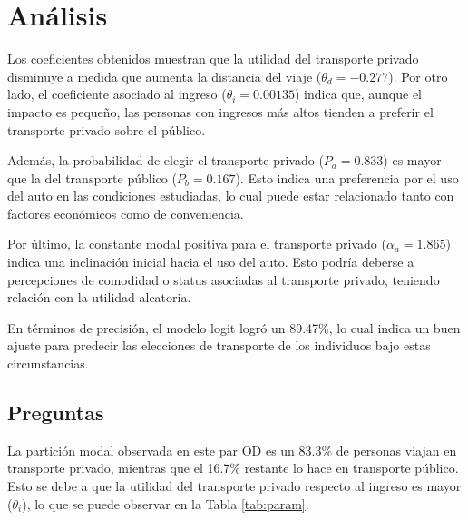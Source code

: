 \section{Análisis}

Los coeficientes obtenidos muestran que la utilidad del transporte privado disminuye a medida que aumenta la distancia del viaje ($\theta_d = -0.277$). Por otro lado, el coeficiente asociado al ingreso ($\theta_i = 0.00135$) indica que, aunque el impacto es pequeño, las personas con ingresos más altos tienden a preferir el transporte privado sobre el público.

Además, la probabilidad de elegir el transporte privado ($P_a = 0.833$) es mayor que la del transporte público ($P_b = 0.167$). Esto indica una preferencia por el uso del auto en las condiciones estudiadas, lo cual puede estar relacionado tanto con factores económicos como de conveniencia.

Por último, la constante modal positiva para el transporte privado ($\alpha_a = 1.865$) indica una inclinación inicial hacia el uso del auto. Esto podría deberse a percepciones de comodidad o status asociadas al transporte privado, teniendo relación con la utilidad aleatoria.

En términos de precisión, el modelo logit logró un 89.47\%, lo cual indica un buen ajuste para predecir las elecciones de transporte de los individuos bajo estas circunstancias.

\subsection{Preguntas}

La partición modal observada en este par OD es un 83.3\% de personas viajan en transporte privado, mientras que el 16.7\% restante lo hace en transporte público. Esto se debe a que la utilidad del transporte privado respecto al ingreso es mayor ($\theta_{i}$), lo que se puede observar en la Tabla \ref{tab:param}.

